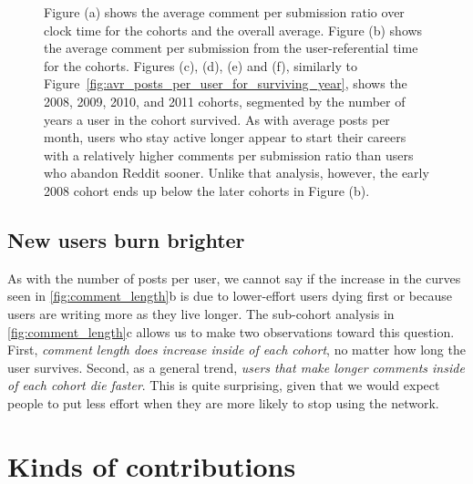 \documentclass[10pt, oneside, onecolumn]{article}
\begin{document}
\begin{figure}[!tb]
\centering
{}
\caption{Figure (a) shows the average comment per submission ratio over clock time for the cohorts and the overall average. Figure (b) shows the average comment per submission from the user-referential time for the cohorts. Figures (c), (d), (e) and (f), similarly to Figure~\ref{fig:avr_posts_per_user_for_surviving_year}, shows the 2008, 2009, 2010, and 2011 cohorts, segmented by the number of years a user in the cohort survived.  As with average posts per month, users who stay active longer appear to start their careers with a relatively higher comments per submission ratio than users who abandon Reddit sooner.  Unlike that analysis, however, the early 2008 cohort ends up below the later cohorts in Figure (b).}
\label{fig:comments_submissions}
\end{figure}

\subsection{New users burn brighter}
As with the number of posts per user, we cannot say if the increase in the curves seen in \ref{fig:comment_length}b is due to lower-effort users dying first or because users are writing more as they live longer.  The sub-cohort analysis in \ref{fig:comment_length}c allows us to make two observations toward this question.  First, \textit{comment length does increase inside of each cohort}, no matter how long the user survives.  Second, as a general trend, \textit{users that make longer comments inside of each cohort die faster}. This is quite surprising, given that we would expect people to put less effort when they are more likely to stop using the network.

\section{Kinds of contributions}
\end{document}
